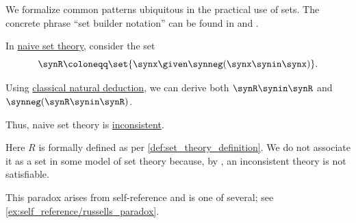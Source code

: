 \begin{comments}
  \item We formalize common patterns ubiquitous in the practical use of sets. The concrete phrase \enquote{set builder notation} can be found in \cite[10]{CitkinMuravitsky2022ConsequenceRelations} and \cite[122]{Rosen2019DiscreteMathematics}.
\end{comments}

\begin{theorem}\label{thm:russels_paradox}
  In \hyperref[def:naive_set_theory]{naive set theory}, consider the set
  \begin{equation*}
    \synR \coloneqq \set{ \synx \given \synneg (\synx \synin \synx) }.
  \end{equation*}

  Using \hyperref[def:fol_natural_deduction_system]{classical natural deduction}, we can derive both \( \synR \synin \synR \) and \( \synneg (\synR \synin \synR) \).
\end{theorem}
\begin{comments}
  \item Thus, naive set theory is \hyperref[def:fol_theory/consistent]{inconsistent}.

  \item Here \( R \) is formally defined as per \cref{def:set_theory_definition}. We do not associate it as a set in some model of set theory because, by , an inconsistent theory is not satisfiable.

  \item This paradox arises from self-reference and is one of several; see \cref{ex:self_reference/russells_paradox}.
\end{comments}
